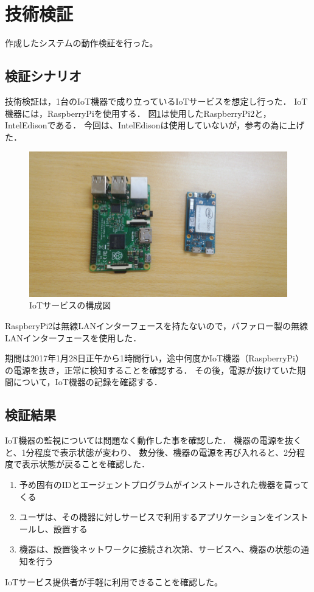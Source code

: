 \section{技術検証}
作成したシステムの動作検証を行った。

\subsection{検証シナリオ}
技術検証は，1台のIoT機器で成り立っているIoTサービスを想定し行った．
IoT機器には，RaspberryPiを使用する．
図\ref{fig:device}は使用したRaspberryPi2と，IntelEdisonである．
今回は、IntelEdisonは使用していないが，参考の為に上げた．
\begin{figure}[htbp]
\includegraphics[width=14cm]{images/device.png}
\caption{IoTサービスの構成図}
\label{fig:device}
\end{figure}

RaspberyPi2は無線LANインターフェースを持たないので，バファロー製の無線LANインターフェースを使用した．

期間は2017年1月28日正午から1時間行い，途中何度かIoT機器（RaspberryPi）の電源を抜き，正常に検知することを確認する．
その後，電源が抜けていた期間について，IoT機器の記録を確認する．

\subsection{検証結果}
IoT機器の監視については問題なく動作した事を確認した．
機器の電源を抜くと、1分程度で表示状態が変わり、
数分後、機器の電源を再び入れると、2分程度で表示状態が戻ることを確認した．


\begin{enumerate}
\item 予め固有のIDとエージェントプログラムがインストールされた機器を買ってくる
\item ユーザは、その機器に対しサービスで利用するアプリケーションをインストールし、設置する
\item 機器は、設置後ネットワークに接続され次第、サービスへ、機器の状態の通知を行う
\end{enumerate}
IoTサービス提供者が手軽に利用できることを確認した。


